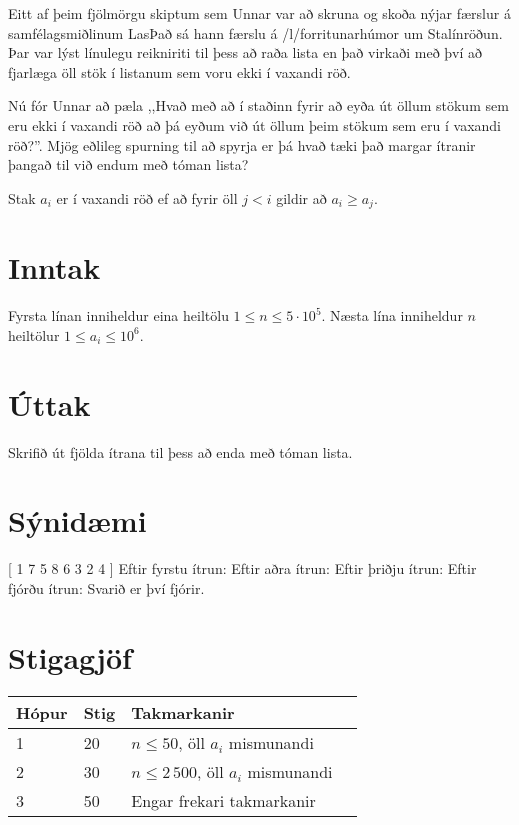 Eitt af þeim fjölmörgu skiptum sem Unnar var að skruna og skoða nýjar færslur á
samfélagsmiðlinum LasÞað sá hann færslu á /l/forritunarhúmor um Stalínröðun.
Þar var lýst línulegu reikniriti til þess að raða lista en það virkaði með því að
fjarlæga öll stök í listanum sem voru ekki í vaxandi röð.

Nú fór Unnar að pæla ,,Hvað með að í staðinn fyrir að eyða út öllum stökum sem eru ekki í vaxandi
röð að þá eyðum við út öllum þeim stökum sem eru í vaxandi röð?''. Mjög eðlileg spurning til að spyrja er
þá hvað tæki það margar ítranir þangað til við endum með tóman lista?

Stak $a_i$ er í vaxandi röð ef að fyrir öll $j < i$ gildir að $a_i \geq a_j$.

\section*{Inntak}
Fyrsta línan inniheldur eina heiltölu $1 \leq n \leq 5 \cdot 10^5$.
Næsta lína inniheldur $n$ heiltölur $1 \leq a_i \leq 10^6$. 

\section*{Úttak}
Skrifið út fjölda ítrana til þess að enda með tóman lista.

\section*{Sýnidæmi}

[ 1 7 5 8 6 3 2 4 ]\newline
Eftir fyrstu ítrun:\newline
[ 5 6 3 2 4 ]\newline
Eftir aðra ítrun:\newline
[ 3 2 4 ]\newline
Eftir þriðju ítrun:\newline
[ 2 ]\newline
Eftir fjórðu ítrun:\newline
[ ]\newline
Svarið er því fjórir.

\section*{Stigagjöf}
\begin{tabular}{|l|l|l|l|}
\hline
Hópur & Stig & Takmarkanir \\ \hline
1     & 20   & $n \leq 50$, öll $a_i$ mismunandi \\ \hline
2     & 30   & $n \leq 2\,500$, öll $a_i$ mismunandi \\ \hline
3     & 50   & Engar frekari takmarkanir\\ \hline
\end{tabular}
